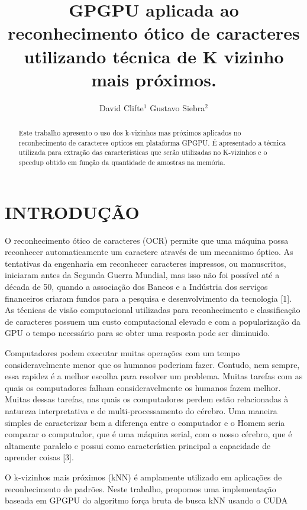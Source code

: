 \documentclass[letterpaper, 10 pt, conference]{ieeeconf}  %
\title{\LARGE \bf
GPGPU aplicada ao reconhecimento ótico de caracteres utilizando técnica de K vizinho mais próximos.
}
\author{David Clifte$^{1}$  Gustavo Siebra$^{2}$%
}
\begin{document}
\maketitle
\thispagestyle{empty}
\pagestyle{empty}


\begin{abstract}
Este trabalho apresento o uso dos k-vizinhos mas próximos aplicados no
reconhecimento de caracteres opticos em plataforma GPGPU. É apresentado a
técnica utilizada para extração das características que serão utilizadas no
K-vizinhos e o speedup obtido em função da quantidade de amostras na memória.
\end{abstract}


\section{INTRODUÇÃO}

O reconhecimento ótico de caracteres (OCR) permite que uma máquina possa
reconhecer automaticamente um caractere através de um mecanismo óptico. As tentativas
da engenharia em reconhecer caracteres impressos, ou manuscritos, iniciaram antes da
Segunda Guerra Mundial, mas isso não foi possível até a década de 50, quando a associação
dos Bancos e a Indústria dos serviços financeiros criaram fundos para a pesquisa e
desenvolvimento da tecnologia [1]. As técnicas de visão computacional
utilizadas para reconhecimento e classificação de caracteres possuem um custo
computacional elevado e com a popularização da GPU o tempo necessário para se
obter uma resposta pode ser diminuido.

Computadores podem executar muitas operações com um tempo consideravelmente
menor que os humanos poderiam fazer. Contudo, nem sempre, essa rapidez é a melhor
escolha para resolver um problema. Muitas tarefas com as quais os computadores falham
consideravelmente os humanos fazem melhor. Muitas dessas tarefas, nas quais os computadores
perdem estão relacionadas à natureza interpretativa e de multi-processamento do
cérebro. Uma maneira simples de caracterizar bem a diferença entre o computador e o
Homem seria comparar o computador, que é uma máquina serial, com o nosso cérebro,
que é altamente paralelo e possui como característica principal a capacidade de aprender
coisas [3].

O k-vizinhos mais próximos (kNN) é amplamente utilizado em aplicações de
reconhecimento de padrões.
Neste trabalho, propomos uma implementação baseada em GPGPU do algoritmo
força bruta de busca kNN usando o CUDA
\end{document}
